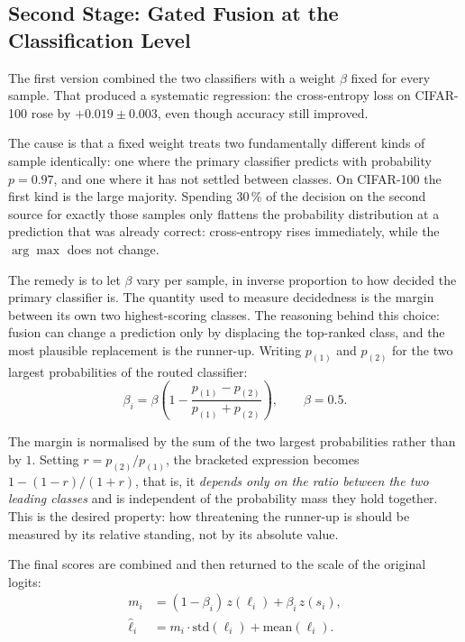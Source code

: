 \documentclass[11pt,a4paper]{article}
\begin{document}
\subsection{Second Stage: Gated Fusion at the Classification Level}
\label{sec:stage2}

The first version combined the two classifiers with a weight $\beta$ fixed for
every sample. That produced a systematic regression: the cross-entropy loss on
CIFAR-100 rose by $+0.019 \pm 0.003$, even though accuracy still improved.

The cause is that a fixed weight treats two fundamentally different kinds of
sample identically: one where the primary classifier predicts with probability
$p = 0.97$, and one where it has not settled between classes. On CIFAR-100 the
first kind is the large majority. Spending $30\,\%$ of the decision on the second
source for exactly those samples only flattens the probability distribution at a
prediction that was already correct: cross-entropy rises immediately, while the
$\arg\max$ does not change.

The remedy is to let $\beta$ vary per sample, in inverse proportion to how
decided the primary classifier is. The quantity used to measure decidedness is
the margin between its own two highest-scoring classes. The reasoning behind
this choice: fusion can change a prediction only by displacing the top-ranked
class, and the most plausible replacement is the runner-up. Writing $p_{(1)}$
and $p_{(2)}$ for the two largest probabilities of the routed classifier:
\begin{equation}
\beta_i = \beta \left( 1 - \frac{p_{(1)} - p_{(2)}}{p_{(1)} + p_{(2)}} \right),
\qquad \beta = 0.5 .
\label{eq:gate}
\end{equation}

The margin is normalised by the sum of the two largest probabilities rather than
by $1$. Setting $r = p_{(2)}/p_{(1)}$, the bracketed expression becomes
$1 - (1-r)/(1+r)$, that is, it \emph{depends only on the ratio between the two
leading classes} and is independent of the probability mass they hold together.
This is the desired property: how threatening the runner-up is should be
measured by its relative standing, not by its absolute value.

The final scores are combined and then returned to the scale of the original
logits:
\begin{align}
m_i &= (1 - \beta_i)\, z(\ell_i) + \beta_i\, z(s_i),\\
\hat{\ell}_i &= m_i \cdot \mathrm{std}(\ell_i) + \mathrm{mean}(\ell_i).
\label{eq:affine}
\end{align}
\end{document}
